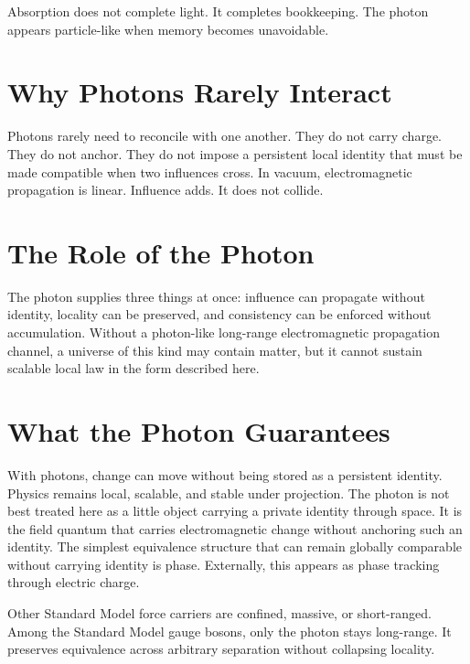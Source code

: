 \documentclass[11pt,twoside,openright]{book}
\begin{document}
Absorption does not complete light. It completes bookkeeping. The photon appears particle-like when memory becomes unavoidable.

\section*{Why Photons Rarely Interact}

Photons rarely need to reconcile with one another. They do not carry charge. They do not anchor. They do not impose a persistent local identity that must be made compatible when two influences cross. In vacuum, electromagnetic propagation is linear. Influence adds. It does not collide.

\section*{The Role of the Photon}

The photon supplies three things at once: influence can propagate without identity, locality can be preserved, and consistency can be enforced without accumulation. Without a photon-like long-range electromagnetic propagation channel, a universe of this kind may contain matter, but it cannot sustain scalable local law in the form described here.

\section*{What the Photon Guarantees}

With photons, change can move without being stored as a persistent identity. Physics remains local, scalable, and stable under projection. The photon is not best treated here as a little object carrying a private identity through space. It is the field quantum that carries electromagnetic change without anchoring such an identity. The simplest equivalence structure that can remain globally comparable without carrying identity is phase. Externally, this appears as phase tracking through electric charge.

Other Standard Model force carriers are confined, massive, or short-ranged. Among the Standard Model gauge bosons, only the photon stays long-range. It preserves equivalence across arbitrary separation without collapsing locality.
\end{document}
